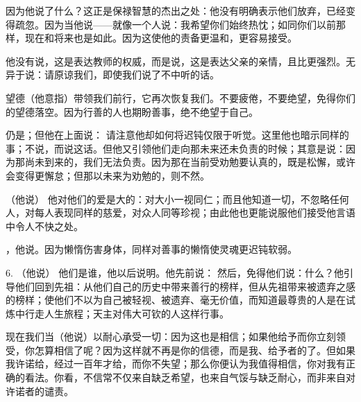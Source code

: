 因为他说了什么？这正是保禄智慧的杰出之处：他没有明确表示他们放弃，已经变得疏忽。因为当他说——就像一个人说：我希望你们始终热忱；如同你们以前那样，现在和将来也是如此。因为这使他的责备更温和，更容易接受。\par

他没有说，这是表达教师的权威，而是说，这是表达父亲的亲情，且比更强烈。无异于说：请原谅我们，即使我们说了不中听的话。\par

望德（他意指）带领我们前行，它再次恢复我们。不要疲倦，不要绝望，免得你们的望德落空。因为行善的人也期盼善事，绝不绝望于自己。\par

 仍是；但他在上面说： 请注意他却如何将迟钝仅限于听觉。这里他也暗示同样的事；不说，而说这话。但他又引领他们走向那未来还未负责的时候；其意是说：因为那尚未到来的，我们无法负责。因为那在当前受劝勉要认真的，既是松懈，或许会变得更懈怠；但那以未来为劝勉的，则不然。\par

（他说） 他对他们的爱是大的：对大小一视同仁；而且他知道一切，不忽略任何人，对每人表现同样的慈爱，对众人同等珍视；由此他也更能说服他们接受他言语中令人不快之处。\par

，他说。因为懒惰伤害身体，同样对善事的懒惰使灵魂更迟钝软弱。\par

6. （他说） 他们是谁，他以后说明。他先前说： 然后，免得他们说：什么？他引导他们回到先祖：从他们自己的历史中带来善行的榜样，但从先祖带来被遗弃之感的榜样；使他们不以为自己被轻视、被遗弃、毫无价值，而知道最尊贵的人是在试炼中行走人生旅程；天主对伟大可钦的人这样行事。\par

现在我们当（他说）以耐心承受一切：因为这也是相信；如果他给予而你立刻领受，你怎算相信了呢？因为这样就不再是你的信德，而是我、给予者的了。但如果我许诺给，经过一百年才给，而你不失望；那么你便认为我值得相信，你对我有正确的看法。你看，不信常不仅来自缺乏希望，也来自气馁与缺乏耐心，而非来自对许诺者的谴责。\par

